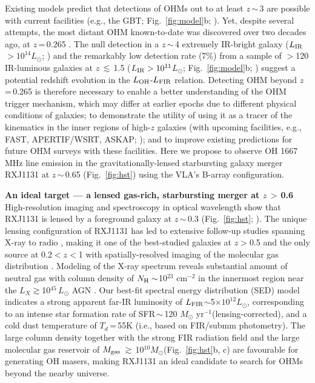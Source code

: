 \documentclass[letterpaper,11pt]{article}
\newcommand{\Lsun}{\mbox{$L_{\odot}$}\xspace}
\newcommand{\Msun}{\mbox{$M_{\odot}$}\xspace}
\newcommand{\LIR}{\mbox{$L_{\rm IR}$}\xspace}
\newcommand{\LFIR}{\mbox{$L_{\rm FIR}$}\xspace}
\newcommand{\LOH}{$L_{\rm OH}$\xspace}
\newcommand{\pmOne}{\mbox{$^{-1}$}\xspace}
\newcommand{\Fig}[1]{Fig.~\ref{fig:#1}}
\newcommand{\E}[1]{\mbox{$\times10^{#1}$}}
\newcommand{\eq}{\,=\,}
\newcommand{\ssim}{\,$\sim$\,}
\begin{document}
\noindent Existing models predict that detections of
OHMs out to at least $z$\ssim3 are possible with current facilities (e.g., the GBT; \Fig{model}b; \citealt{Darling02b_LF}).
Yet, despite several attempts,
the most distant OHM known-to-date was discovered over two decades ago, at $z$\eq0.265 \citep{Baan92a}.
The null detection in a $z$\ssim4 extremely IR-bright galaxy (\LIR$>10^{14}$\Lsun; \citealt{Ivison06a}) and
the remarkably low detection rate (7\%) from a sample of $>$120 IR-luminous galaxies
at $z$\,$\lesssim$\,1.5 ($L_{\rm IR}>10^{11}$\Lsun; \Fig{model}b; \citealt{Willett12a})
suggest a potential redshift evolution in the \LOH-\LFIR relation.
Detecting OHM beyond $z$\eq0.265 is therefore necessary to enable a better understanding of the
OHM trigger mechanism, which may differ at earlier epochs due to different physical conditions of galaxies;
to demonstrate the utility of using it as a tracer of the kinematics in the inner regions of high-$z$ galaxies (with upcoming facilities,
e.g., FAST, APERTIF/WSRT, ASKAP; \citealt[][]{Zhang14b});
and to improve existing predictions for future OHM surveys with these facilities.
Here we propose to observe OH 1667 MHz line emission in the
gravitationally-lensed starbursting galaxy merger
RXJ1131 at $z$\ssim0.65 (\Fig{hst}) using the VLA's B-array configuration.

\noindent \textbf{An ideal target --- a lensed gas-rich, starbursting merger at $z$\,$>$\,0.6}\\
\noindent High-resolution imaging and spectroscopy in optical wavelength show that RXJ1131 is
lensed by a foreground galaxy at $z$\ssim0.3 (\Fig{hst}; \citealt{Sluse03a}).
The unique lensing configuration of RXJ1131 has led to extensive follow-up studies spanning X-ray to radio \citep[\Fig{hst}e; e.g.,][]{Claeskens06a, Sluse07a, Leung17a},
making it one of the best-studied galaxies at $z$$>$0.5 and
the only source at 0.2$<$$z$$<$1 with spatially-resolved imaging of the molecular gas distribution \citep{Leung17a}.
Modeling of the X-ray spectrum reveals substantial amount of neutral gas with column density of
$N_{\rm H}\sim$10$^{23}$ cm$^{-2}$ in the innermost region near 
the $L_X$$\gtrsim$10$^{45}$\,\Lsun AGN \citep{Pooley07a, Reis14a}.
Our best-fit spectral energy distribution (SED) model indicates
a strong apparent far-IR luminosity of \LFIR$\sim$5\E{12}\Lsun, corresponding to
an intense star formation rate of SFR\ssim120 \Msun yr\pmOne (lensing-corrected), and a cold dust temperature of $T_{d}$\eq55K
(i.e., based on FIR/submm photometry).
The large column density together with the strong FIR radiation field
and the large molecular gas reservoir of $M_{\rm gas}$\,$\gtrsim$\,10$^{10}$\Msun (\Fig{hst}b, c)
are favourable for generating OH masers, making RXJ1131 an ideal candidate
to search for OHMs beyond the nearby universe. 
\end{document}
